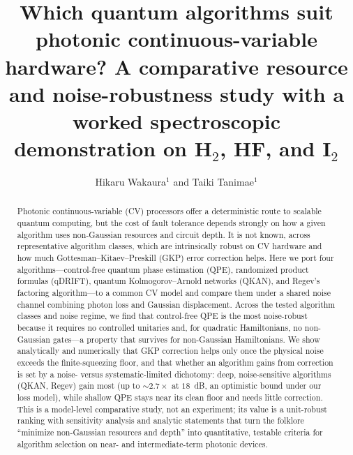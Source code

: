 \documentclass[12pt]{iopart}
\begin{document}
\title[Algorithm suitability for photonic CV hardware]{Which quantum
algorithms suit photonic continuous-variable hardware? A comparative
resource and noise-robustness study with a worked spectroscopic
demonstration on H$_2$, HF, and I$_2$}

\author{Hikaru Wakaura$^{1}$ and Taiki Tanimae$^{1}$}
\address{$^{1}$ QIRI (Quantum Integrated Research Institute Inc.),
1--16--3 Akasaka, Minato-ku, Tokyo 107--0061, Japan}

\begin{abstract} 
Photonic continuous-variable (CV) processors offer a deterministic route
to scalable quantum computing, but the cost of fault tolerance depends 
strongly on how a given algorithm uses non-Gaussian resources and circuit
depth. It is not known, across representative algorithm classes, which are
intrinsically robust on CV hardware and how much Gottesman--Kitaev--Preskill
(GKP) error correction helps. Here we port four algorithms---control-free
quantum phase estimation (QPE), randomized product formulas (qDRIFT), quantum
Kolmogorov--Arnold networks (QKAN), and Regev's factoring algorithm---to a
common CV model and compare them under a shared noise channel combining
photon loss and Gaussian displacement. Across the tested algorithm classes and
noise regime, we find that control-free QPE is the most noise-robust because it
requires no controlled unitaries and, for quadratic Hamiltonians, no 
non-Gaussian gates---a property that survives for non-Gaussian Hamiltonians. We
show analytically and numerically that GKP correction helps only once the
physical noise exceeds the finite-squeezing floor, and that whether an
algorithm gains from correction is set by a noise- versus systematic-limited
dichotomy: deep, noise-sensitive algorithms (QKAN, Regev) gain most (up to
$\sim\!2.7\times$ at $18$~dB, an optimistic bound under our loss model), while
shallow QPE stays near its clean floor and needs little correction. This is a
model-level comparative study, not an experiment; its value is a unit-robust
ranking with sensitivity analysis and analytic statements that turn the
folklore ``minimize non-Gaussian resources and depth'' into quantitative,
testable criteria for algorithm selection on near- and intermediate-term
photonic devices. 
\end{abstract} 
 
\maketitle  
 
\end{document}
